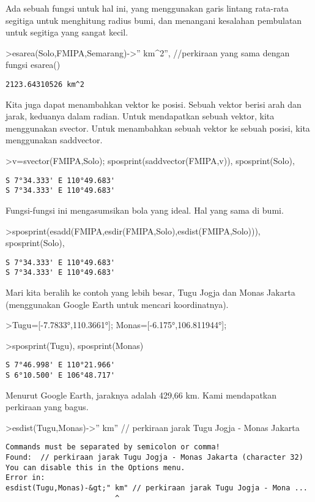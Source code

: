 \documentclass[
]{book}
\begin{document}
Ada sebuah fungsi untuk hal ini, yang menggunakan garis lintang rata-rata segitiga untuk menghitung radius bumi, dan menangani kesalahan pembulatan untuk segitiga yang sangat kecil.

\textgreater esarea(Solo,FMIPA,Semarang)-\textgreater'' km\^{}2'', //perkiraan yang sama dengan fungsi esarea()

\begin{verbatim}
2123.64310526 km^2
\end{verbatim}

Kita juga dapat menambahkan vektor ke posisi. Sebuah vektor berisi arah dan jarak, keduanya dalam radian. Untuk mendapatkan sebuah vektor, kita menggunakan svector. Untuk menambahkan sebuah vektor ke sebuah posisi, kita menggunakan saddvector.

\textgreater v=svector(FMIPA,Solo); sposprint(saddvector(FMIPA,v)), sposprint(Solo),

\begin{verbatim}
S 7°34.333' E 110°49.683'
S 7°34.333' E 110°49.683'
\end{verbatim}

Fungsi-fungsi ini mengasumsikan bola yang ideal. Hal yang sama di bumi.

\textgreater sposprint(esadd(FMIPA,esdir(FMIPA,Solo),esdist(FMIPA,Solo))), sposprint(Solo),

\begin{verbatim}
S 7°34.333' E 110°49.683'
S 7°34.333' E 110°49.683'
\end{verbatim}

Mari kita beralih ke contoh yang lebih besar, Tugu Jogja dan Monas Jakarta (menggunakan Google Earth untuk mencari koordinatnya).

\textgreater Tugu={[}-7.7833°,110.3661°{]}; Monas={[}-6.175°,106.811944°{]};

\textgreater sposprint(Tugu), sposprint(Monas)

\begin{verbatim}
S 7°46.998' E 110°21.966'
S 6°10.500' E 106°48.717'
\end{verbatim}

Menurut Google Earth, jaraknya adalah 429,66 km. Kami mendapatkan perkiraan yang bagus.

\textgreater esdist(Tugu,Monas)-\textgreater'' km'' // perkiraan jarak Tugu Jogja - Monas Jakarta

\begin{verbatim}
Commands must be separated by semicolon or comma!
Found:  // perkiraan jarak Tugu Jogja - Monas Jakarta (character 32)
You can disable this in the Options menu.
Error in:
esdist(Tugu,Monas)-&gt;" km" // perkiraan jarak Tugu Jogja - Mona ...
                         ^
\end{verbatim}
\end{document}
